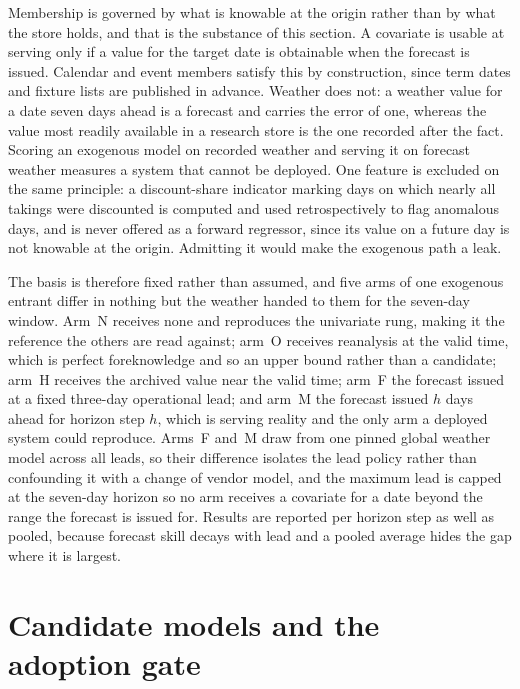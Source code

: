 Membership is governed by what is knowable at the origin rather than by what the store holds, and
that is the substance of this section. A covariate is usable at serving only if a value for the
target date is obtainable when the forecast is issued. Calendar and event members satisfy this by
construction, since term dates and fixture lists are published in advance. Weather does not: a
weather value for a date seven days ahead is a forecast and carries the error of one, whereas the
value most readily available in a research store is the one recorded after the fact. Scoring an
exogenous model on recorded weather and serving it on forecast weather measures a system that
cannot be deployed. One feature is excluded on the same principle: a discount-share indicator
marking days on which nearly all takings were discounted is computed and used retrospectively to
flag anomalous days, and is never offered as a forward regressor, since its value on a future day
is not knowable at the origin. Admitting it would make the exogenous path a leak.

The basis is therefore fixed rather than assumed, and five arms of one exogenous entrant differ in
nothing but the weather handed to them for the seven-day window. Arm~N receives none and
reproduces the univariate rung, making it the reference the others are read against; arm~O
receives reanalysis at the valid time, which is perfect foreknowledge and so an upper bound rather
than a candidate; arm~H receives the archived value near the valid time; arm~F the forecast issued
at a fixed three-day operational lead; and arm~M the forecast issued $h$ days ahead for horizon
step $h$, which is serving reality and the only arm a deployed system could reproduce. Arms~F
and~M draw from one pinned global weather model across all leads, so their difference isolates the
lead policy rather than confounding it with a change of vendor model, and the maximum lead is
capped at the seven-day horizon so no arm receives a covariate for a date beyond the range the
forecast is issued for. Results are reported per horizon step as well as pooled, because forecast
skill decays with lead and a pooled average hides the gap where it is largest.

\section{Candidate models and the adoption gate}
\label{sec:ladder}

